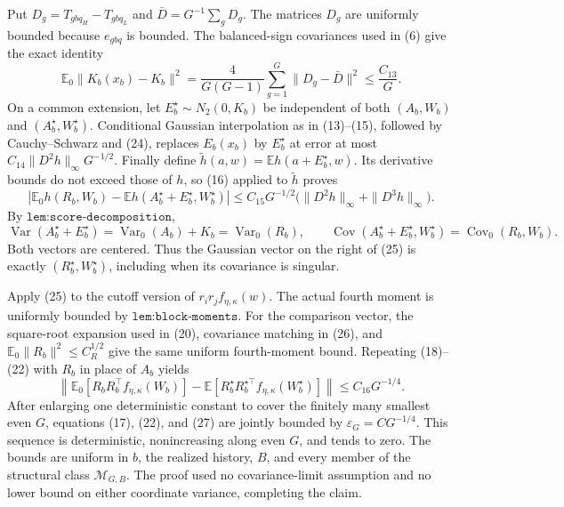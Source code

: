 Put \(D_g=T_{gbq_H}-T_{gbq_L}\) and \(\bar D=G^{-1}\sum_gD_g\).  The matrices \(D_g\) are uniformly bounded because \(e_{gbq}\) is bounded.  The balanced-sign covariances used in (6) give the exact identity
\[
 \mathbb E_0\|K_b(x_b)-K_b\|^2
 =\frac4{G(G-1)}\sum_{g=1}^G\|D_g-\bar D\|^2
 \leq \frac{C_{13}}G.                                                     \tag{24}
\]
On a common extension, let \(E_b^\star\sim N_2(0,K_b)\) be independent of both \((A_b,W_b)\) and \((A_b^\star,W_b^\star)\).  Conditional Gaussian interpolation as in (13)--(15), followed by Cauchy--Schwarz and (24), replaces \(E_b(x_b)\) by \(E_b^\star\) at error at most \(C_{14}\|D^2h\|_\infty G^{-1/2}\).  Finally define
\(
 \widetilde h(a,w)=\mathbb E h(a+E_b^\star,w)
\).  Its derivative bounds do not exceed those of \(h\), so (16) applied to \(\widetilde h\) proves
\[
 \left|\mathbb E_0h(R_b,W_b)
       -\mathbb Eh(A_b^\star+E_b^\star,W_b^\star)\right|
 \leq C_{15}G^{-1/2}
       \bigl(\|D^2h\|_\infty+\|D^3h\|_\infty\bigr).                   \tag{25}
\]
By \(\texttt{lem:score-decomposition}\),
\[
 \operatorname{Var}(A_b^\star+E_b^\star)
 =\operatorname{Var}_0(A_b)+K_b=\operatorname{Var}_0(R_b),
 \qquad
 \operatorname{Cov}(A_b^\star+E_b^\star,W_b^\star)
 =\operatorname{Cov}_0(R_b,W_b).                                         \tag{26}
\]
Both vectors are centered.  Thus the Gaussian vector on the right of (25) is exactly \((R_b^\star,W_b^\star)\), including when its covariance is singular.

Apply (25) to the cutoff version of \(r_ir_jf_{\eta,\kappa}(w)\).  The actual fourth moment is uniformly bounded by \(\texttt{lem:block-moments}\).  For the comparison vector, the square-root expansion used in (20), covariance matching in (26), and \(\mathbb E_0\|R_b\|^2\leq C_R^{1/2}\) give the same uniform fourth-moment bound.  Repeating (18)--(22) with \(R_b\) in place of \(A_b\) yields
\[
 \left\|\mathbb E_0[R_bR_b^\top f_{\eta,\kappa}(W_b)]
 -\mathbb E[R_b^\star R_b^{\star\top}f_{\eta,\kappa}(W_b^\star)]
 \right\|\leq C_{16}G^{-1/4}.                                           \tag{27}
\]
After enlarging one deterministic constant to cover the finitely many smallest even \(G\), equations (17), (22), and (27) are jointly bounded by
\(
 \varepsilon_G=C G^{-1/4}
\).  This sequence is deterministic, nonincreasing along even \(G\), and tends to zero.  The bounds are uniform in \(b\), the realized history, \(B\), and every member of the structural class \(\mathcal M_{G,B}\).  The proof used no covariance-limit assumption and no lower bound on either coordinate variance, completing the claim.